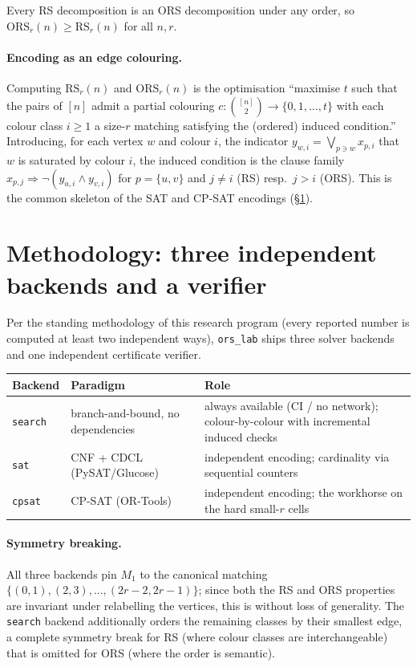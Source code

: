 \documentclass[11pt]{article}
\newcommand{\RS}{\mathrm{RS}}
\newcommand{\ORS}{\mathrm{ORS}}
\begin{document}
Every RS decomposition is an ORS decomposition under any order, so
$\ORS_r(n)\ge\RS_r(n)$ for all $n,r$.

\paragraph{Encoding as an edge colouring.} Computing $\RS_r(n)$ and
$\ORS_r(n)$ is the optimisation ``maximise $t$ such that the pairs of $[n]$
admit a partial colouring $c:\binom{[n]}{2}\to\{0,1,\dots,t\}$ with each
colour class $i\ge1$ a size-$r$ matching satisfying the (ordered) induced
condition.'' Introducing, for each vertex $w$ and colour $i$, the indicator
$y_{w,i}=\bigvee_{p\ni w}x_{p,i}$ that $w$ is saturated by colour $i$, the
induced condition is the clause family
$x_{p,j}\Rightarrow\neg(y_{u,i}\wedge y_{v,i})$ for $p=\{u,v\}$ and
$j\ne i$ (RS) resp.\ $j>i$ (ORS). This is the common skeleton of the SAT and
CP-SAT encodings (\S\ref{sec:method}).

\section{Methodology: three independent backends and a verifier}\label{sec:method}

Per the standing methodology of this research program (every reported number
is computed at least two independent ways), \texttt{ors\_lab} ships three
solver backends and one independent certificate verifier.

\begin{center}\footnotesize
\begin{tabular}{@{}llp{}@{}}
\toprule
Backend & Paradigm & Role \\
\midrule
\texttt{search} & branch-and-bound, no dependencies & always available (CI / no network); colour-by-colour with incremental induced checks \\
\texttt{sat} & CNF + CDCL (PySAT/Glucose) & independent encoding; cardinality via sequential counters \\
\texttt{cpsat} & CP-SAT (OR-Tools) & independent encoding; the workhorse on the hard small-$r$ cells \\
\bottomrule
\end{tabular}
\end{center}

\paragraph{Symmetry breaking.} All three backends pin $M_1$ to the canonical
matching $\{(0,1),(2,3),\dots,(2r{-}2,2r{-}1)\}$; since both the RS and ORS
properties are invariant under relabelling the vertices, this is
without loss of generality. The \texttt{search} backend additionally orders
the remaining classes by their smallest edge, a complete symmetry break for
RS (where colour classes are interchangeable) that is omitted for ORS (where
the order is semantic).
\end{document}
